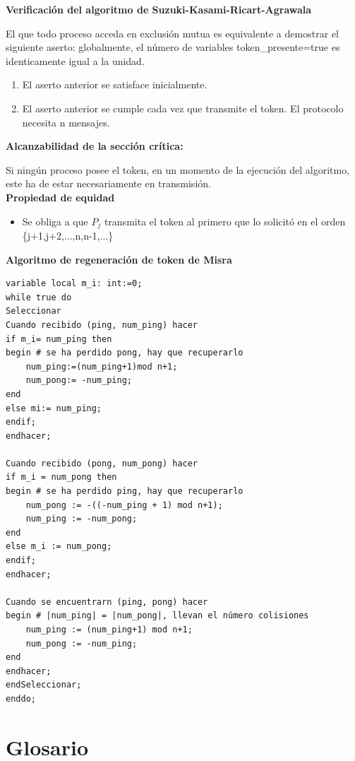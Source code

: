 \documentclass[a4paper,11pt]{article}
\begin{document}
\textbf{Verificación del algoritmo de Suzuki-Kasami-Ricart-Agrawala}

El que todo proceso acceda en exclusión mutua es equivalente a demostrar el siguiente aserto: globalmente, el número de variables token\_presente=true es identicamente igual a la unidad.

\begin{enumerate}
\item El aserto anterior se satisface inicialmente.
\item El aserto anterior se cumple cada vez que transmite el token. El protocolo necesita n mensajes.
\end{enumerate}

\textbf{Alcanzabilidad de la sección crítica:}

Si ningún proceso posee el token, en un momento de la ejecución del algoritmo, este ha de estar necesariamente en transmisión.\\

\textbf{Propiedad de equidad}
\begin{itemize}
\item Se obliga a que $P_j$ transmita el token al primero que lo solicitó en el orden \{j+1,j+2,...,n,n-1,...\}
\end{itemize}

\textbf{Algoritmo de regeneración de token de Misra}
\begin{verbatim}
variable local m_i: int:=0;
while true do 
Seleccionar
Cuando recibido (ping, num_ping) hacer
if m_i= num_ping then
begin # se ha perdido pong, hay que recuperarlo
	num_ping:=(num_ping+1)mod n+1;
	num_pong:= -num_ping;
end
else mi:= num_ping;
endif;
endhacer;

Cuando recibido (pong, num_pong) hacer
if m_i = num_pong then
begin # se ha perdido ping, hay que recuperarlo
	num_pong := -((-num_ping + 1) mod n+1);
	num_ping := -num_pong;
end
else m_i := num_pong;
endif;
endhacer;

Cuando se encuentrarn (ping, pong) hacer
begin # |num_ping| = |num_pong|, llevan el número colisiones
	num_ping := (num_ping+1) mod n+1;
	num_pong := -num_ping;
end
endhacer;
endSeleccionar;
enddo;
\end{verbatim}
\section{Glosario}
\end{document}
